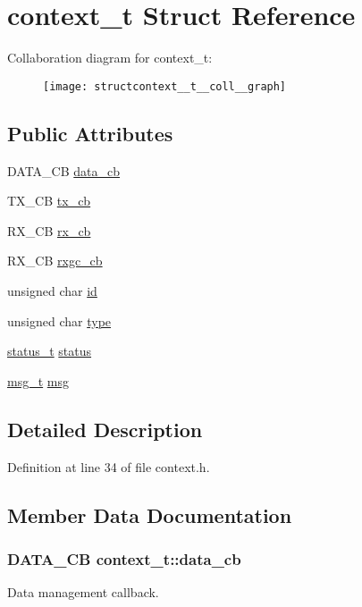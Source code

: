 \hypertarget{structcontext__t}{\section{context\-\_\-t Struct Reference}
\label{structcontext__t}
}


Collaboration diagram for context\-\_\-t\-:
\nopagebreak
\begin{figure}[H]
\begin{center}
\leavevmode
\texttt{[image: structcontext\_\_t\_\_coll\_\_graph]}
\end{center}
\end{figure}
\subsection*{Public Attributes}
\begin{DoxyCompactItemize}
\item 
D\-A\-T\-A\-\_\-\-C\-B \hyperlink{structcontext__t_ae79525e2fb5ec4ad5b6beb03c0fd9579}{data\-\_\-cb}
\item 
T\-X\-\_\-\-C\-B \hyperlink{structcontext__t_a06d2b435c29a01be998e6383fec2ef50}{tx\-\_\-cb}
\item 
R\-X\-\_\-\-C\-B \hyperlink{structcontext__t_a9d4451da3b62a2ec269ae7fd2f6b24b8}{rx\-\_\-cb}
\item 
R\-X\-\_\-\-C\-B \hyperlink{structcontext__t_a108cbe016d12bac90d1582ed0cca91e8}{rxgc\-\_\-cb}
\item 
unsigned char \hyperlink{structcontext__t_afcfccef1ae4111aee136acf0d92b4379}{id}
\item 
unsigned char \hyperlink{structcontext__t_a2dbb966924ef90bfba1876ad8a3872af}{type}
\item 
\hyperlink{structstatus__t}{status\-\_\-t} \hyperlink{structcontext__t_a0e49b82a79be5df63399ddbcc0cc022c}{status}
\item 
\hyperlink{structmsg__t}{msg\-\_\-t} \hyperlink{structcontext__t_ae806cd53ff68971d122ab6f854d22b8d}{msg}
\end{DoxyCompactItemize}


\subsection{Detailed Description}


Definition at line 34 of file context.\-h.



\subsection{Member Data Documentation}
\hypertarget{structcontext__t_ae79525e2fb5ec4ad5b6beb03c0fd9579}{
\subsubsection[{data\-\_\-cb}]{\setlength{\rightskip}{0pt plus 5cm}D\-A\-T\-A\-\_\-\-C\-B context\-\_\-t\-::data\-\_\-cb}}\label{structcontext__t_ae79525e2fb5ec4ad5b6beb03c0fd9579}
Data management callback. 

